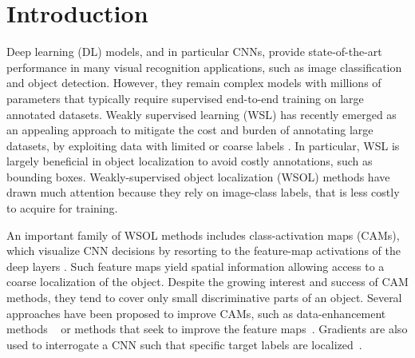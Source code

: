 \documentclass[twocolumn]{article}
\theoremstyle{definition}
\begin{document}
\section{Introduction}
\label{sec:intro}


Deep learning (DL) models, and in particular CNNs, provide state-of-the-art performance in many visual recognition applications, such as image classification and object detection. However, they remain complex  models with millions of parameters that typically require supervised end-to-end training on large annotated datasets. Weakly supervised learning (WSL) has recently emerged as an appealing approach to mitigate the cost and burden of annotating large datasets, by exploiting data with limited or coarse labels \cite{zhou2017brief}. In particular, WSL is largely beneficial in object localization to avoid costly annotations, such as bounding boxes. Weakly-supervised object localization (WSOL) methods have drawn much attention because they rely on image-class labels, that is less costly to acquire for training.

An important family of WSOL methods includes class-activation maps (CAMs), which visualize CNN decisions by resorting to the feature-map activations of the deep layers \cite{zhou2016learning}. Such feature maps yield spatial information allowing access to a coarse localization of the object. Despite the growing interest and success of CAM methods, they tend to cover only small discriminative parts of an object.
Several approaches have been proposed to improve CAMs, such as data-enhancement methods ~\cite{ChoeS19,SinghL17, WeiFLCZY17,YunHCOYC19, ZhangWF0H18} or methods that seek to improve the feature maps~\cite{LeeKLLY19,RahimiSAHB20,wei2021shallowspol,WeiXSJFH18,XueLWJJY19iccvdanet,YangKKK20,ZhangCW20,ZhangWKYH18}. Gradients are also used to interrogate a CNN such that specific target labels are localized~\cite{fu2020axiom, lin2013network, PinheiroC15cvpr}.
\end{document}
